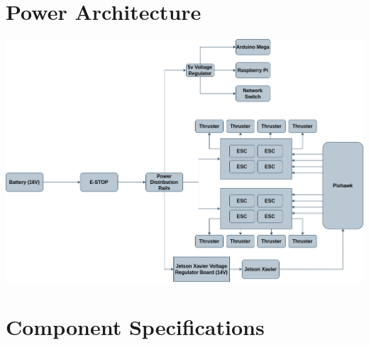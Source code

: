 \documentclass[conference]{IEEEtran}
\begin{document}
\pagebreak
\section{Power Architecture}


\vspace{0.5cm}
\includegraphics[scale=0.45]{images/power.png}
\newpage

\clearpage
\section{Component Specifications}
\end{document}
